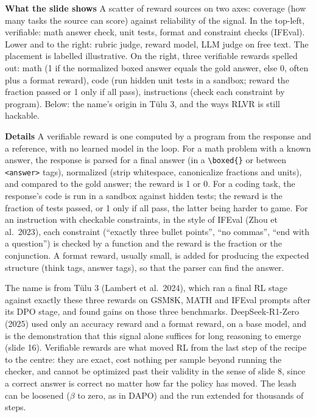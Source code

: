 \documentclass[11pt,letterpaper]{article}
\newcommand{\para}[1]{\medskip\noindent\textbf{#1}\quad}
\begin{document}
\para{What the slide shows} A scatter of reward sources on two axes: coverage (how many tasks the source can score) against reliability of the signal. In the top-left, verifiable: math answer check, unit tests, format and constraint checks (IFEval). Lower and to the right: rubric judge, reward model, LLM judge on free text. The placement is labelled illustrative. On the right, three verifiable rewards spelled out: math (1 if the normalized boxed answer equals the gold answer, else 0, often plus a format reward), code (run hidden unit tests in a sandbox; reward the fraction passed or 1 only if all pass), instructions (check each constraint by program). Below: the name's origin in Tülu 3, and the ways RLVR is still hackable.

\para{Details} A verifiable reward is one computed by a program from the response and a reference, with no learned model in the loop. For a math problem with a known answer, the response is parsed for a final answer (in a \verb|\boxed{}| or between \texttt{<answer>} tags), normalized (strip whitespace, canonicalize fractions and units), and compared to the gold answer; the reward is 1 or 0. For a coding task, the response's code is run in a sandbox against hidden tests; the reward is the fraction of tests passed, or 1 only if all pass, the latter being harder to game. For an instruction with checkable constraints, in the style of IFEval (Zhou et al.\ 2023), each constraint (``exactly three bullet points'', ``no commas'', ``end with a question'') is checked by a function and the reward is the fraction or the conjunction. A format reward, usually small, is added for producing the expected structure (think tags, answer tags), so that the parser can find the answer.

The name is from Tülu 3 (Lambert et al.\ 2024), which ran a final RL stage against exactly these three rewards on GSM8K, MATH and IFEval prompts after its DPO stage, and found gains on those three benchmarks. DeepSeek-R1-Zero (2025) used only an accuracy reward and a format reward, on a base model, and is the demonstration that this signal alone suffices for long reasoning to emerge (slide 16). Verifiable rewards are what moved RL from the last step of the recipe to the centre: they are exact, cost nothing per sample beyond running the checker, and cannot be optimized past their validity in the sense of slide 8, since a correct answer is correct no matter how far the policy has moved. The leash can be loosened ($\beta$ to zero, as in DAPO) and the run extended for thousands of steps.
\end{document}

